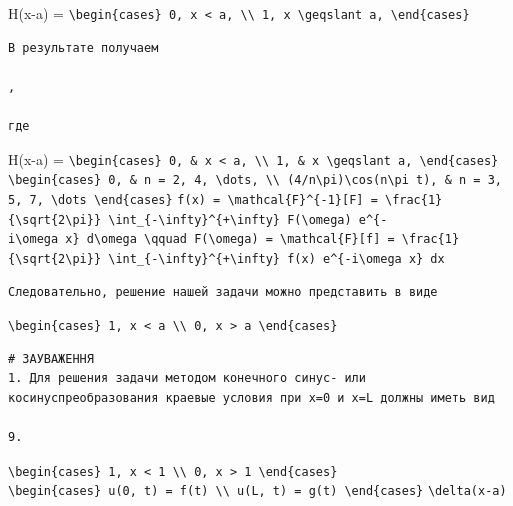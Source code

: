 \documentclass[
  ukrainian,
]{article}
\begin{document}
H(x-a) =
\texttt{\textbackslash{}begin\{cases\}\ 0,\ x\ \textless{}\ a,\ \textbackslash{}\textbackslash{}\ 1,\ x\ \textbackslash{}geqslant\ a,\ \textbackslash{}end\{cases\}}

\begin{verbatim}
В результате получаем

,

где
\end{verbatim}

H(x-a) =
\texttt{\textbackslash{}begin\{cases\}\ 0,\ \&\ x\ \textless{}\ a,\ \textbackslash{}\textbackslash{}\ 1,\ \&\ x\ \textbackslash{}geqslant\ a,\ \textbackslash{}end\{cases\}}
\texttt{\textbackslash{}begin\{cases\}\ 0,\ \&\ n\ =\ 2,\ 4,\ \textbackslash{}dots,\ \textbackslash{}\textbackslash{}\ (4/n\textbackslash{}pi)\textbackslash{}cos(n\textbackslash{}pi\ t),\ \&\ n\ =\ 3,\ 5,\ 7,\ \textbackslash{}dots\ \textbackslash{}end\{cases\}}
\texttt{f(x)\ =\ \textbackslash{}mathcal\{F\}\^{}\{-1\}{[}F{]}\ =\ \textbackslash{}frac\{1\}\{\textbackslash{}sqrt\{2\textbackslash{}pi\}\}\ \textbackslash{}int\_\{-\textbackslash{}infty\}\^{}\{+\textbackslash{}infty\}\ F(\textbackslash{}omega)\ e\^{}\{-i\textbackslash{}omega\ x\}\ d\textbackslash{}omega\ \textbackslash{}qquad\ F(\textbackslash{}omega)\ =\ \textbackslash{}mathcal\{F\}{[}f{]}\ =\ \textbackslash{}frac\{1\}\{\textbackslash{}sqrt\{2\textbackslash{}pi\}\}\ \textbackslash{}int\_\{-\textbackslash{}infty\}\^{}\{+\textbackslash{}infty\}\ f(x)\ e\^{}\{-i\textbackslash{}omega\ x\}\ dx}

\begin{verbatim}
Следовательно, решение нашей задачи можно представить в виде
\end{verbatim}

\texttt{\textbackslash{}begin\{cases\}\ 1,\ \textbar{}x\textbar{}\ \textless{}\ a\ \textbackslash{}\textbackslash{}\ 0,\ \textbar{}x\textbar{}\ \textgreater{}\ a\ \textbackslash{}end\{cases\}}

\begin{verbatim}
# ЗАУВАЖЕННЯ
1. Для решения задачи методом конечного синус- или косинуспреобразования краевые условия при x=0 и x=L должны иметь вид

9.
\end{verbatim}

\texttt{\textbackslash{}begin\{cases\}\ 1,\ \textbar{}x\textbar{}\ \textless{}\ 1\ \textbackslash{}\textbackslash{}\ 0,\ \textbar{}x\textbar{}\ \textgreater{}\ 1\ \textbackslash{}end\{cases\}}
\texttt{\textbackslash{}begin\{cases\}\ u(0,\ t)\ =\ f(t)\ \textbackslash{}\textbackslash{}\ u(L,\ t)\ =\ g(t)\ \textbackslash{}end\{cases\}}
\texttt{\textbackslash{}delta(x-a)}
\end{document}
